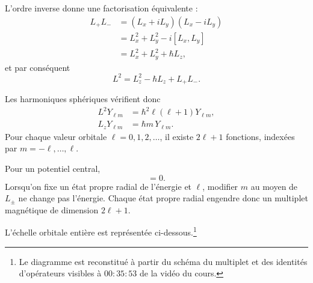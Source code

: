 L’ordre inverse donne une factorisation équivalente :
\begin{align}
L_+L_-
&=(L_x+iL_y)(L_x-iL_y) \\
&=L_x^2+L_y^2-i[L_x,L_y] \\
&=L_x^2+L_y^2+\hbar L_z,
\end{align}
et par conséquent
\begin{equation}
L^2=L_z^2-\hbar L_z+L_+L_-.
\end{equation}

\begin{classroomqa}\end{classroomqa}

Les harmoniques sphériques vérifient donc
\begin{align}
L^2Y_{\ell m}
&=\hbar^2\ell(\ell+1)Y_{\ell m}, \\
L_zY_{\ell m}
&=\hbar m\,Y_{\ell m}.
\end{align}
Pour chaque valeur orbitale \(\ell=0,1,2,\ldots\), il existe \(2\ell+1\) fonctions, indexées par \(m=-\ell,\ldots,\ell\).

Pour un potentiel central,
\begin{equation}
[H,L_i]=0.
\end{equation}
Lorsqu’on fixe un état propre radial de l’énergie et \(\ell\), modifier \(m\) au moyen de \(L_\pm\) ne change pas l’énergie. Chaque état propre radial engendre donc un multiplet magnétique de dimension \(2\ell+1\).

L’échelle orbitale entière est représentée ci-dessous.\footnote{Le diagramme est reconstitué à partir du schéma du multiplet et des identités d’opérateurs visibles à \(00{:}35{:}53\) de la vidéo du cours.}

